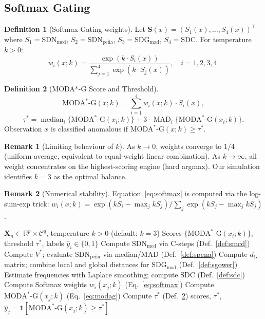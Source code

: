 \documentclass[11pt]{article}
\theoremstyle{plain}
\theoremstyle{definition}
\newtheorem{definition}{Definition}
\newtheorem{remark}{Remark}
\DeclareMathOperator{\MAD}{MAD}
\DeclareMathOperator{\median}{median}
\newcommand{\R}{\mathbb{R}}
\newcommand{\C}{\mathcal{C}}
\newcommand{\moda}{\text{MODA}^*\text{-G}}
\begin{document}
\subsection{Softmax Gating}
\label{sec:gating}

\begin{definition}[Softmax Gating weights]
\label{def:gating}
Let $\mathbf{S}(x) = (S_1(x), \ldots, S_4(x))^\top$
where $S_1 = \text{SDN}_\text{mcd}$,
$S_2 = \text{SDN}_\text{pe\~{n}a}$,
$S_3 = \text{SDG}_\text{mad}$, $S_4 = \text{SDC}$.
For temperature $k > 0$:
\begin{equation}
  w_i(x; k) = \frac{\exp(k \cdot S_i(x))}
  {\sum_{j=1}^{4} \exp(k \cdot S_j(x))},
  \quad i = 1,2,3,4.
  \label{eq:softmax}
\end{equation}
\end{definition}

\begin{definition}[MODA*-G Score and Threshold]
\label{def:modag}
\begin{equation}
  \moda(x; k) = \sum_{i=1}^{4} w_i(x; k) \cdot S_i(x),
  \label{eq:modag}
\end{equation}
\[
  \tau^* = \median_i\{\moda(x_i;k)\}
           + 3\cdot\MAD_i\{\moda(x_i;k)\}.
\]
Observation $x$ is classified anomalous if
$\moda(x;k) \geq \tau^*$.
\end{definition}

\begin{remark}[Limiting behaviour of $k$]
As $k \to 0$, weights converge to $1/4$ (uniform average,
equivalent to equal-weight linear combination). As
$k \to \infty$, all weight concentrates on the
highest-scoring engine (hard argmax). Our simulation
identifies $k=3$ as the optimal balance.
\end{remark}

\begin{remark}[Numerical stability]
Equation~\eqref{eq:softmax} is computed via the
log-sum-exp trick:
$w_i(x;k) = \exp(kS_i - \max_j kS_j) /
\sum_j \exp(kS_j - \max_j kS_j)$.
\end{remark}

\begin{algorithm}[H]
\caption{MODA*-G: Complete Algorithm}
\label{alg:modag}
\begin{algorithmic}[1]
\Require $\mathbf{X}_n \subset \R^p \times \C^q$,
  temperature $k > 0$ (default: $k=3$)
\Ensure Scores $\{\moda(x_i;k)\}$, threshold $\tau^*$,
  labels $\hat{y}_i \in \{0,1\}$
\State Compute $\text{SDN}_\text{mcd}$
  via C-steps (Def.~\ref{def:smcd})
\State Compute $V^*$; evaluate $\text{SDN}_\text{pe\~{n}a}$
  via median/MAD (Def.~\ref{def:spena})
\State Compute $d_G$ matrix; combine local and global
  distances for $\text{SDG}_\text{mad}$
  (Def.~\ref{def:sgower})
\State Estimate frequencies with Laplace smoothing;
  compute $\text{SDC}$ (Def.~\ref{def:sdc})
\State Compute Softmax weights $w_i(x_j; k)$
  (Eq.~\eqref{eq:softmax})
\State Compute $\moda(x_j; k)$ (Eq.~\eqref{eq:modag})
\State Compute $\tau^*$ (Def.~\ref{def:modag})
\State \Return scores, $\tau^*$,
  $\hat{y}_j = \mathbf{1}[\moda(x_j;k) \geq \tau^*]$
\end{algorithmic}
\end{algorithm}
\end{document}
